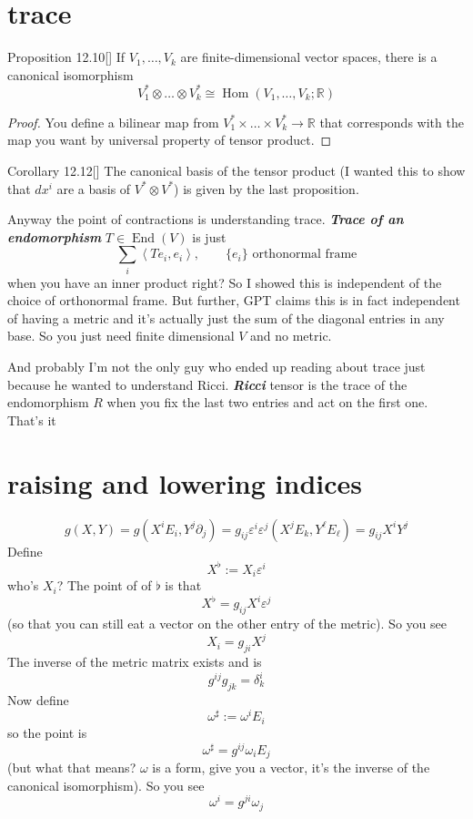 \section{trace}

\begin{thing4}{Proposition 12.10}[\cite{les}]\label{prop:12.10}\leavevmode
If  \(V_1,\ldots,V_k\) are finite-dimensional vector spaces, there is a canonical isomorphism
\[V_1^*  \otimes\ldots \otimes V^*_k \cong \operatorname{Hom}(V_1,\ldots,V_k;\mathbb{R})\]
\end{thing4}
\begin{proof}\leavevmode
You define a bilinear map from \(V^*_1 \times \ldots \times V^*_k \to \mathbb{R}\) that corresponds with the map you want by universal property of tensor product.
\end{proof}

\begin{thing6}{Corollary 12.12}[\cite{les}]\leavevmode
The canonical basis of the tensor product (I wanted this to show that \(dx^i\) are a basis of \(V^* \otimes V^*\)) is given by the last proposition.
\end{thing6}

Anyway the point of contractions is understanding trace. \textit{\textbf{Trace of an endomorphism}} \(T \in \operatorname{End}(V)\) is just
\[\sum_i \left<Te_i,e_i\right>,\qquad \{e_i\}\text{ orthonormal frame} \]
when you have an inner product right? So I showed this is independent of the choice of orthonormal frame. But further, GPT claims this is in fact independent of having a metric and it's actually just the sum of the diagonal entries in any base. So you just need finite dimensional \(V\) and no metric.

And probably I'm not the only guy who ended up reading about trace just because he wanted to understand Ricci. \textit{\textbf{Ricci}} tensor is the trace of the endomorphism  \(R\) when you fix the last two entries and act on the first one. That's it

\section{raising and lowering indices}

\[g(X,Y)=g(X^iE_i,Y^j\partial_j)=g_{ij}\varepsilon^i\varepsilon^j(X^jE_k,Y^\ell E_\ell)=g_{ij}X^iY^j\]
Define
\[X^\flat:=X_i\varepsilon^i\]
who's \(X_i\)? The point of of \(\flat\) is that
\[X^\flat =g_{ij}X^i\varepsilon^j\]
(so that you can still eat a vector on the other entry of the metric). So you see
\[X_i=g_{ji}X^j\]
The inverse of the metric matrix exists and is
\[g^{ij}g_{j k}=\delta^i_k\]
Now define
\[\omega^\sharp:=\omega^iE_i\]
so the point is
\[\omega^\sharp=g^{ij}\omega_iE_j\]
(but what that means? \(\omega\) is a form, give you a vector, it's the inverse of the canonical isomorphism). So you see
\[\omega^i=g^{ji}\omega_j\]



